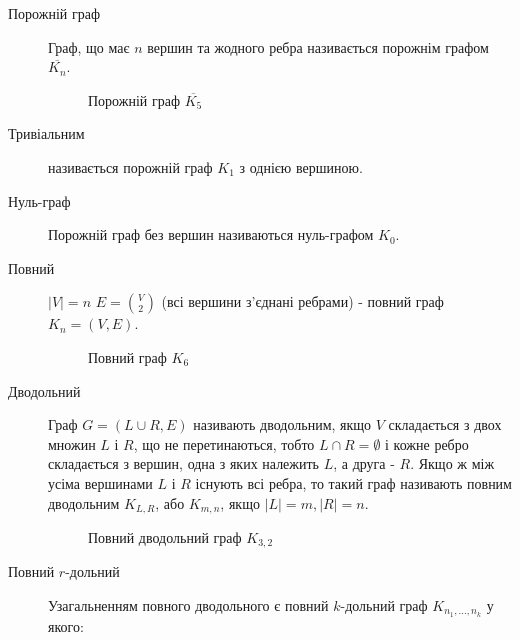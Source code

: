 \begin{description}
        \item[Порожній граф] Граф, що має $n$ вершин та жодного ребра називається порожнім графом $\overline{K_n}$.
          \begin{figure}[h]
            \centering
            \caption{Порожній граф $\overline{K_5}$}
            \label{empty_graph_5}
          \end{figure}
        \item[Тривіальним] називається порожній граф $K_1$ з однією вершиною.
        \item[Нуль-граф] Порожній граф без вершин називаються нуль-графом $K_0$.
        \item[Повний] $\vert V \vert = n$ $E = {V \choose 2}$ (всі вершини з'єднані ребрами) - повний граф $K_n = (V,E)$.
          \begin{figure}[h]
            \centering
            \caption{Повний граф $K_6$}
            \label{complete_graph_6}
          \end{figure}
        \item[Дводольний] Граф $G = (L \cup R,E)$ називають дводольним, якщо $V$ складається з двох множин $L$ і $R$, що не перетинаються, тобто $L \cap R = \emptyset$ і кожне ребро складається з вершин, одна з яких належить $L$, а друга - $R$. Якщо ж між усіма вершинами $L$ і $R$ існують всі ребра, то такий граф називають повним дводольним $K_{L,R}$, або $K_{m,n}$, якщо $\vert L \vert = m, \vert R \vert = n$.
          \begin{figure}[h]
            \centering
            \caption{Повний дводольний граф $K_{3,2}$}
            \label{bipartite_graph_3_2}
          \end{figure}
        \item[Повний $r$-дольний] Узагальненням повного дводольного є повний $k$-дольний граф $K_{n_1,\dots,n_k}$ у якого:

\end{description}
